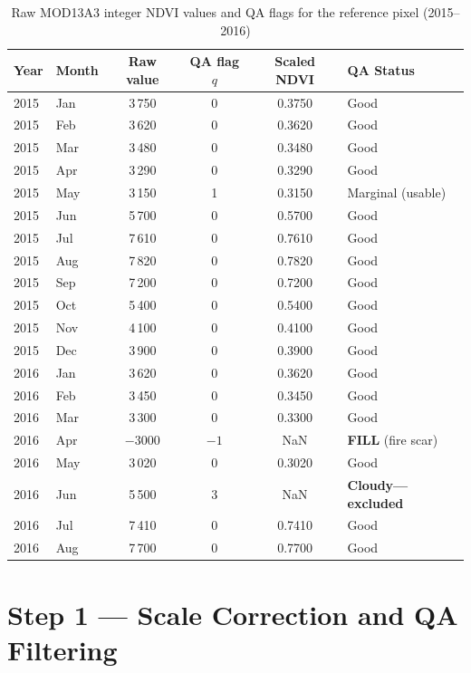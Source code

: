 \documentclass[12pt, a4paper]{article}
\begin{document}
\begin{table}[H]
\centering
\caption{Raw MOD13A3 integer NDVI values and QA flags for
         the reference pixel (2015--2016)}
\label{tab:raw_data}
\small
\begin{tabular}{@{}llcccl@{}}
\toprule
\textbf{Year} & \textbf{Month} & \textbf{Raw value} &
\textbf{QA flag $q$} & \textbf{Scaled NDVI} &
\textbf{QA Status} \\
\midrule
2015 & Jan & 3\,750  & 0 & 0.3750  & Good \\
2015 & Feb & 3\,620  & 0 & 0.3620  & Good \\
2015 & Mar & 3\,480  & 0 & 0.3480  & Good \\
2015 & Apr & 3\,290  & 0 & 0.3290  & Good \\
2015 & May & 3\,150  & 1 & 0.3150  & Marginal (usable) \\
2015 & Jun & 5\,700  & 0 & 0.5700  & Good \\
2015 & Jul & 7\,610  & 0 & 0.7610  & Good \\
2015 & Aug & 7\,820  & 0 & 0.7820  & Good \\
2015 & Sep & 7\,200  & 0 & 0.7200  & Good \\
2015 & Oct & 5\,400  & 0 & 0.5400  & Good \\
2015 & Nov & 4\,100  & 0 & 0.4100  & Good \\
2015 & Dec & 3\,900  & 0 & 0.3900  & Good \\
\midrule
2016 & Jan & 3\,620  & 0 & 0.3620  & Good \\
2016 & Feb & 3\,450  & 0 & 0.3450  & Good \\
2016 & Mar & 3\,300  & 0 & 0.3300  & Good \\
2016 & Apr & $-3000$ & $-1$ & NaN & \textbf{FILL} (fire scar) \\
2016 & May & 3\,020  & 0 & 0.3020  & Good \\
2016 & Jun & 5\,500  & 3 & NaN    & \textbf{Cloudy---excluded} \\
2016 & Jul & 7\,410  & 0 & 0.7410  & Good \\
2016 & Aug & 7\,700  & 0 & 0.7700  & Good \\
\bottomrule
\end{tabular}
\end{table}

\section{Step 1 --- Scale Correction and QA Filtering}
\label{sec:step1}
\end{document}
